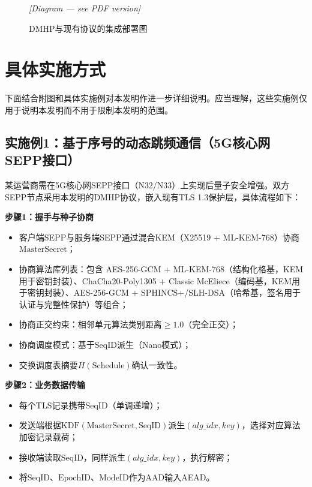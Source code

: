 ﻿\documentclass[12pt,a4paper]{article}
\begin{document}
\begin{figure}[H]
\centering
\textit{[Diagram — see PDF version]}
\caption{DMHP与现有协议的集成部署图}
\end{figure}

\section{具体实施方式}

下面结合附图和具体实施例对本发明作进一步详细说明。应当理解，这些实施例仅用于说明本发明而不用于限制本发明的范围。

\subsection{实施例1：基于序号的动态跳频通信（5G核心网SEPP接口）}

某运营商需在5G核心网SEPP接口（N32/N33）上实现后量子安全增强。双方SEPP节点采用本发明的DMHP协议，嵌入现有TLS 1.3保护层，具体流程如下：

\textbf{步骤1：握手与种子协商}

\begin{itemize}
    \item 客户端SEPP与服务端SEPP通过混合KEM（X25519 + ML-KEM-768）协商$\text{MasterSecret}$；
    \item 协商算法库列表：包含 AES-256-GCM + ML-KEM-768（结构化格基，KEM用于密钥封装）、ChaCha20-Poly1305 + Classic McEliece（编码基，KEM用于密钥封装）、AES-256-GCM + SPHINCS+/SLH-DSA（哈希基，签名用于认证与完整性保护）等组合；
    \item 协商正交约束：相邻单元算法类别距离$\geq 1.0$（完全正交）；
    \item 协商调度模式：基于$\text{SeqID}$派生（Nano模式）；
    \item 交换调度表摘要$H(\text{Schedule})$确认一致性。
\end{itemize}

\textbf{步骤2：业务数据传输}

\begin{itemize}
    \item 每个TLS记录携带$\text{SeqID}$（单调递增）；
    \item 发送端根据$\text{KDF}(\text{MasterSecret}, \text{SeqID})$派生$(alg\_idx, key)$，选择对应算法加密记录载荷；
    \item 接收端读取$\text{SeqID}$，同样派生$(alg\_idx, key)$，执行解密；
    \item 将$\text{SeqID}$、$\text{EpochID}$、$\text{ModeID}$作为AAD输入AEAD。
\end{itemize}
\end{document}

